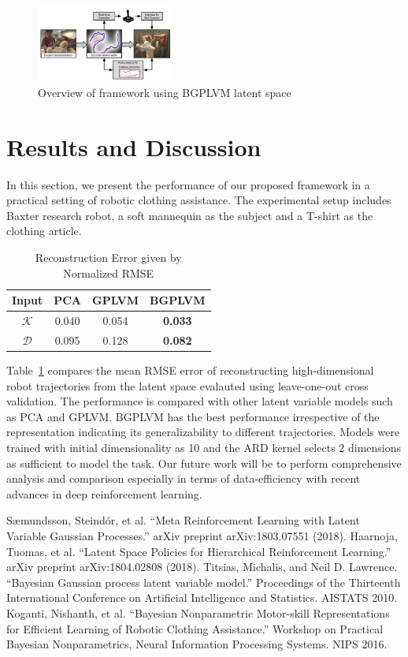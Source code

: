 \documentclass[letterpaper, 10 pt, conference]{ieeeconf}
\begin{document}
\begin{figure}
	\centering
	\includegraphics[width=0.4\textwidth]{overview.pdf}
	\caption{Overview of framework using BGPLVM latent space}
	\label{figure:overview}
\end{figure}

\section{Results and Discussion}
In this section, we present the performance of our proposed framework in a practical setting of robotic clothing assistance. The experimental setup includes Baxter research robot, a soft mannequin as the subject and a T-shirt as the clothing article. 
\begin{table}[h]
	\centering
	\caption{Reconstruction Error given by Normalized RMSE}
	\begin{tabular}{|c|c|c|c|}
		\hline
		Input & PCA & GPLVM & BGPLVM \\
		\hline
		$\mathcal{K}$ & 0.040 & 0.054 & \textbf{0.033} \\
		$\mathcal{D}$ & 0.095 & 0.128 & \textbf{0.082} \\
		\hline
	\end{tabular}
	\label{table:results}
\end{table}
Table~\ref{table:results} compares the mean RMSE error of reconstructing high-dimensional robot trajectories from the latent space evalauted using leave-one-out cross validation. The performance is compared with other latent variable models such as PCA and GPLVM. BGPLVM has the best performance irrespective of the representation indicating its generalizability to different trajectories. Models were trained with initial dimensionality as 10 and the ARD kernel selects 2 dimensions as sufficient to model the task. Our future work will be to perform comprehensive analysis and comparison especially in terms of data-efficiency with recent advances in deep reinforcement learning.

\begin{thebibliography}{10}
Sæmundsson, Steindór, et al. ``Meta Reinforcement Learning with Latent Variable Gaussian Processes.'' arXiv preprint arXiv:1803.07551 (2018).
Haarnoja, Tuomas, et al. ``Latent Space Policies for Hierarchical Reinforcement Learning.'' arXiv preprint arXiv:1804.02808 (2018).
Titsias, Michalis, and Neil D. Lawrence. ``Bayesian Gaussian process latent variable model.'' Proceedings of the Thirteenth International Conference on Artificial Intelligence and Statistics. AISTATS 2010.
Koganti, Nishanth, et al. ``Bayesian Nonparametric Motor-skill Representations for Efficient Learning of Robotic Clothing Assistance.'' Workshop on Practical Bayesian Nonparametrics, Neural Information Processing Systems. NIPS 2016.
\end{thebibliography}
\end{document}
